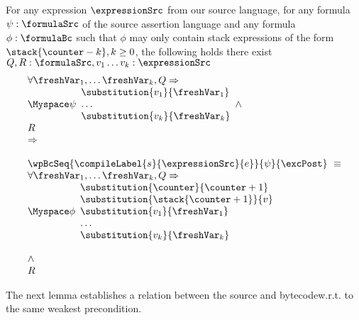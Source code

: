 \begin{exprSrcBcWp2} \label{pogEq:aux:exprSrcBcWp}
 For any expression $\expressionSrc$ from our source language, for any formula $\psi: \formulaSrc$  
of the source assertion language and any formula $\phi: \formulaBc$ such that $\phi$ may only 
contain stack expressions of the form     $\stack{\counter - k}, k \ge 0$, the following holds
there exist $ Q,R:\formulaSrc, v_1 \ldots v_k :\expressionSrc $
$$ \begin{array}{l}
 \forall \freshVar_1, \ldots  \freshVar_k   ,  Q \Rightarrow \\
 \Myspace \psi 
                                                                             \begin{array}{l}
									        \substitution{v_1 }{ \freshVar_1 }  \\
										\ldots \\
										\substitution{v_k}{ \freshVar_k } 
									     \end{array}
          \wedge \\ 
	  R  

      
  \\
\Rightarrow \\
 \\

  
	    \wpBcSeq{ \compileLabel{s}{\expressionSrc}{e} }{ \psi }{\excPost} \  \equiv \\ 
            \forall \freshVar_1, \ldots  \freshVar_k ,   Q \Rightarrow \\
	                      \Myspace \phi \begin{array}{l}
                                       \substitution{\counter}{\counter + 1}\\
			               \substitution{\stack{\counter +1}}{ v }\\
				       \substitution{v_1 }{ \freshVar_1 }  \\
				       \ldots \\
				       \substitution{v_k}{ \freshVar_k } 
                         \end{array} \\ \\
          \wedge \\ 
	  R 
  \end{array}$$
\end{exprSrcBcWp2}



The next lemma establishes  a relation between the source and bytecode\wpName w.r.t. to the same weakest precondition. 

